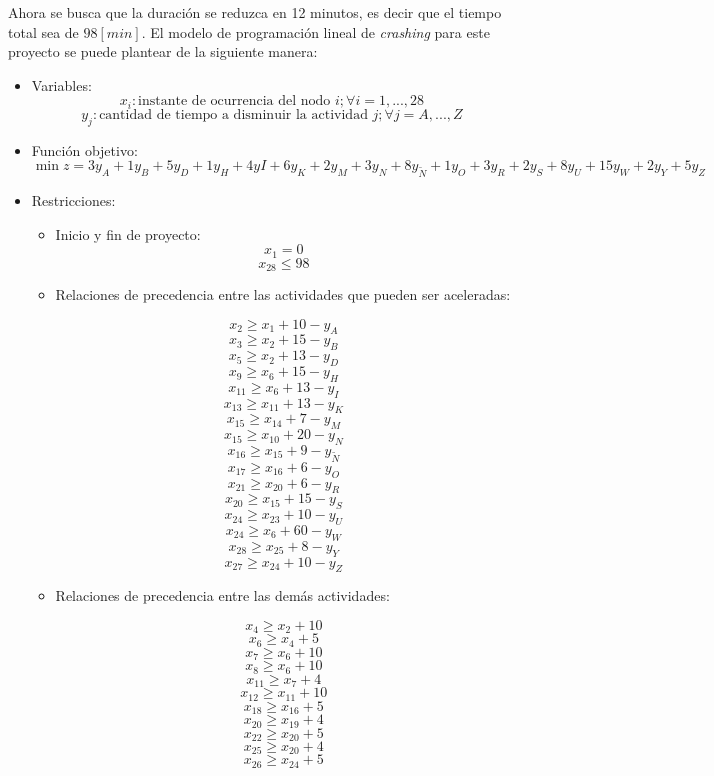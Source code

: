 \documentclass[]{article}
\begin{document}
Ahora se busca que la duración se reduzca en 12 minutos, es decir que el tiempo total sea de $98 [min]$. El modelo de programación lineal de \textit{crashing} para este proyecto se puede plantear de la siguiente manera:

\begin{itemize}
    \item Variables:
        $$x_i: \textrm{instante de ocurrencia del nodo }i;\forall{i}=1,...,28  $$
        $$y_j: \textrm{cantidad de tiempo a disminuir la actividad }j;\forall{j}=A,...,Z  $$
    \item Función objetivo:
        $$\min{z} = 3y_A + 1y_B + 5y_D + 1y_H + 4yI + 6y_K + 2y_M + 3y_N + 8y_{\tilde{N}} + 1y_O + 3y_R + 2y_S + 8y_U + 15y_W + 2y_Y + 5y_Z$$
    \item Restricciones:
        \begin{itemize}
            \item Inicio y fin de proyecto:
                $$x_1=0$$
                $$x_{28}\leq{98}$$
            \item Relaciones de precedencia entre las actividades que pueden ser aceleradas:
            \begin{multicols}{2}
                $$x_2\geq{x_1+10-y_A}$$
                $$x_3\geq{x_2+15-y_B}$$
                $$x_5\geq{x_2+13-y_D}$$
                $$x_9\geq{x_6+15-y_H}$$
                $$x_{11}\geq{x_6+13-y_I}$$
                $$x_{13}\geq{x_{11}+13-y_K}$$
                $$x_{15}\geq{x_{14}+7-y_M}$$
                $$x_{15}\geq{x_{10}+20-y_N}$$
                $$x_{16}\geq{x_{15}+9-y_{\tilde{N}}}$$
                $$x_{17}\geq{x_{16}+6-y_O}$$
                $$x_{21}\geq{x_{20}+6-y_R}$$
                $$x_{20}\geq{x_{15}+15-y_S}$$
                $$x_{24}\geq{x_{23}+10-y_U}$$
                $$x_{24}\geq{x_6+60-y_W}$$
                $$x_{28}\geq{x_{25}+8-y_Y}$$
                $$x_{27}\geq{x_{24}+10-y_Z}$$
                \end{multicols} 

            \item Relaciones de precedencia entre las demás actividades:
                \begin{multicols}{2}
                $$x_4\geq{x_2+10}$$
                $$x_6\geq{x_4+5}$$
                $$x_7\geq{x_6+10}$$
                $$x_8\geq{x_6+10}$$
                $$x_{11}\geq{x_7+4}$$
                $$x_{12}\geq{x_{11}+10}$$
                $$x_{18}\geq{x_{16}+5}$$
                $$x_{20}\geq{x_{19}+4}$$
                $$x_{22}\geq{x_{20}+5}$$
                $$x_{25}\geq{x_{20}+4}$$
                $$x_{26}\geq{x_{24}+5}$$
                \end{multicols} 
                

\end{itemize}
\end{itemize}
\end{document}
